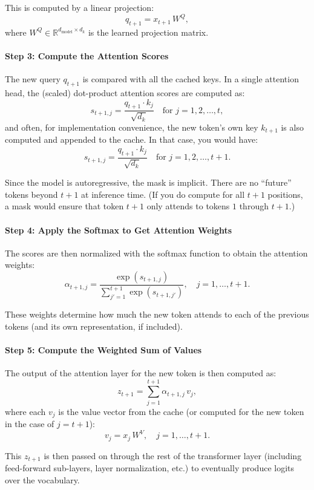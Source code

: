 This is computed by a linear projection:
\[
q_{t+1} = x_{t+1} \, W^Q,
\]
where \( W^Q \in \mathbb{R}^{d_{\text{model}} \times d_k} \) is the learned projection matrix.

\paragraph{Step 3: Compute the Attention Scores}

The new query \( q_{t+1} \) is compared with all the cached keys. In a single attention head, the (scaled) dot-product attention scores are computed as:
\[
s_{t+1,j} = \frac{q_{t+1} \cdot k_j}{\sqrt{d_k}} \quad \text{for } j=1,2,\dots,t,
\]
and often, for implementation convenience, the new token's own key \( k_{t+1} \) is also computed and appended to the cache. In that case, you would have:
\[
s_{t+1,j} = \frac{q_{t+1} \cdot k_j}{\sqrt{d_k}} \quad \text{for } j=1,2,\dots,t+1.
\]

Since the model is autoregressive, the mask is implicit. There are no ``future'' tokens beyond \( t+1 \) at inference time. (If you do compute for all \( t+1 \) positions, a mask would ensure that token \( t+1 \) only attends to tokens \( 1 \) through \( t+1 \).)

\paragraph{Step 4: Apply the Softmax to Get Attention Weights}

The scores are then normalized with the softmax function to obtain the attention weights:
\[
\alpha_{t+1,j} = \frac{\exp(s_{t+1,j})}{\sum_{j'=1}^{t+1} \exp(s_{t+1,j'})}, \quad j = 1,\dots,t+1.
\]

These weights determine how much the new token attends to each of the previous tokens (and its own representation, if included).

\paragraph{Step 5: Compute the Weighted Sum of Values}

The output of the attention layer for the new token is then computed as:
\[
z_{t+1} = \sum_{j=1}^{t+1} \alpha_{t+1,j}\, v_j,
\]
where each \( v_j \) is the value vector from the cache (or computed for the new token in the case of \( j=t+1 \)):
\[
v_j = x_j\, W^V, \quad j = 1,\dots,t+1.
\]

This \( z_{t+1} \) is then passed on through the rest of the transformer layer (including feed-forward sub-layers, layer normalization, etc.) to eventually produce logits over the vocabulary.

